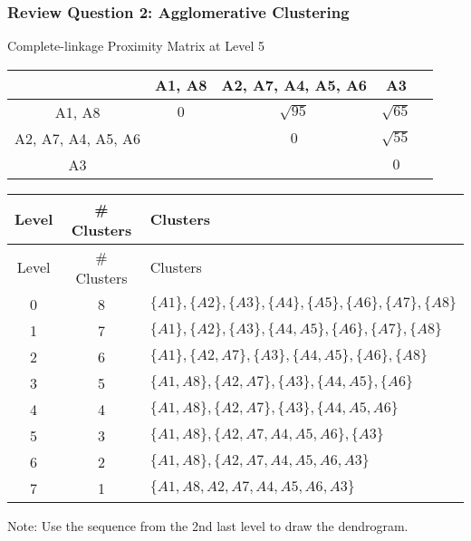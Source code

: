 \documentclass[aspectratio=169, 10pt]{beamer}
\begin{document}
\begin{frame}[t]
\end{frame}

\begin{frame}[t]
    \frametitle{Review Question 2: Agglomerative Clustering}
    \small

    Complete-linkage Proximity Matrix at Level 5

    \begin{table}[]
        \scriptsize
        \begin{tabular}{c|cccc}
        \cellcolor[HTML]{FFFFFF}{\color[HTML]{000000} } & {\color[HTML]{000000} A1, A8} & {\color[HTML]{000000} A2, A7, A4, A5, A6}      & {\color[HTML]{000000} A3}\\ \hline
        {\color[HTML]{000000} A1, A8}                   & {\color[HTML]{000000} $0$}    & {\color[HTML]{000000} $\sqrt{95}$} & {\color[HTML]{000000} $\sqrt{65}$} \\
        {\color[HTML]{000000} A2, A7, A4, A5, A6}                   & {\color[HTML]{000000} }       & {\color[HTML]{000000} $0$}         & {\color[HTML]{fe0000} $\sqrt{55}$} \\
        {\color[HTML]{000000} A3}                       & {\color[HTML]{000000} }       & {\color[HTML]{000000} }            & {\color[HTML]{000000} $0$} \\
        \end{tabular}
    \end{table}

    \begin{table}[]
        \scriptsize
        \begin{tabular}{c|c|l}
        Level & \# Clusters & Clusters \\ \hline
        Level & \# Clusters & Clusters \\ \hline
        0     & 8           & $\{A1\}, \{A2\}, \{A3\}, \{A4\}, \{A5\}, \{A6\}, \{A7\}, \{A8\}$\\
        1     & 7           & $\{A1\}, \{A2\}, \{A3\}, \{A4, A5\}, \{A6\}, \{A7\}, \{A8\}$\\
        2     & 6           & $\{A1\}, \{A2, A7\}, \{A3\}, \{A4, A5\}, \{A6\}, \{A8\}$\\
        3     & 5           & $\{A1, A8\}, \{A2, A7\}, \{A3\}, \{A4, A5\}, \{A6\}$\\
        4     & 4           & $\{A1, A8\}, \{A2, A7\}, \{A3\}, \{A4, A5, A6\}$\\
        5     & 3           & $\{A1, A8\}, \{A2, A7, A4, A5, A6\}, \{A3\}$\\
        6     & 2           & {\color[HTML]{3531FF} $\{A1, A8\}, \{A2, A7, A4, A5, A6, A3\}$}\\
        7     & 1           & $\{A1, A8, A2, A7, A4, A5, A6, A3\}$\\
        \end{tabular}
    \end{table}

    Note: Use the sequence from the 2nd last level to draw the dendrogram. 

\end{frame}
\end{document}
